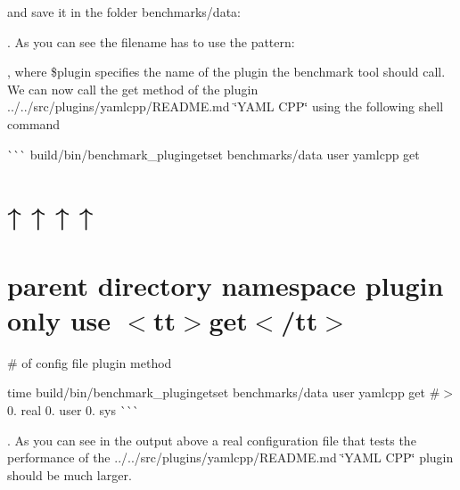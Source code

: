 and save it in the folder {\ttfamily benchmarks/data}\+:


\begin{DoxyCode}{0}
\end{DoxyCode}


. As you can see the filename has to use the pattern\+:


\begin{DoxyCode}{0}
\end{DoxyCode}


, where {\ttfamily \$plugin} specifies the name of the plugin the benchmark tool should call. We can now call the {\ttfamily get} method of the plugin ../../src/plugins/yamlcpp/\+R\+E\+A\+D\+ME.md \char`\"{}\+Y\+A\+M\+L C\+P\+P\char`\"{} using the following shell command

\`{}\`{}\`{} build/bin/benchmark\+\_\+plugingetset benchmarks/data user yamlcpp get \hypertarget{doc_tutorials_benchmarking_md_autotoc_md2567}{}\section{↑              ↑        ↑           ↑}\label{doc_tutorials_benchmarking_md_autotoc_md2567}
\hypertarget{doc_tutorials_benchmarking_md_autotoc_md2568}{}\section{parent directory  namespace  plugin   only use $<$tt$>$get$<$/tt$>$}\label{doc_tutorials_benchmarking_md_autotoc_md2568}
\# of config file plugin method 
\begin{DoxyCode}{0}
\end{DoxyCode}
 time build/bin/benchmark\+\_\+plugingetset benchmarks/data user yamlcpp get \#$>$ 0. real 0. user 0. sys \`{}\`{}\`{}

. As you can see in the output above a real configuration file that tests the performance of the ../../src/plugins/yamlcpp/\+R\+E\+A\+D\+ME.md \char`\"{}\+Y\+A\+M\+L C\+P\+P\char`\"{} plugin should be much larger.